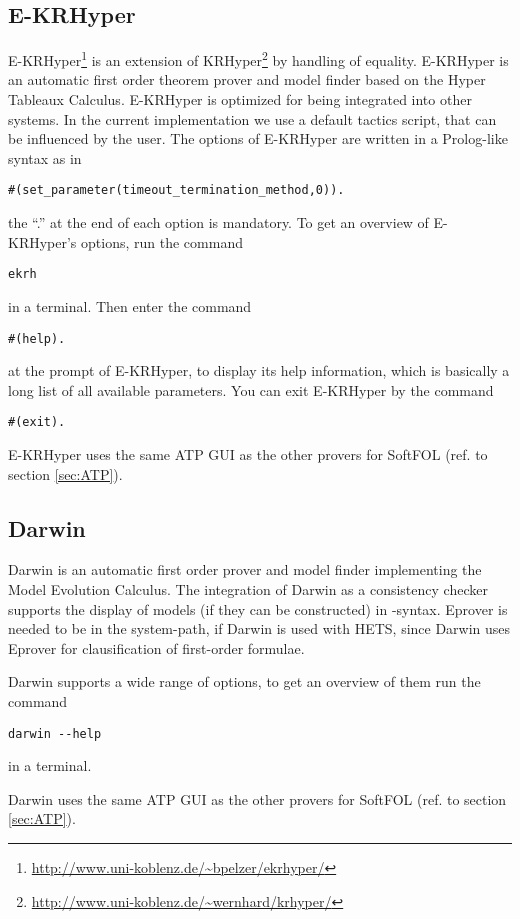 \documentclass{article}
\newcommand{\normalTEXTSC}[2]{{#1\scriptsize#2}}
\newcommand     {\Hets}{\normalTEXTSC{H}{ETS}\xspace}
\begin{document}
\subsection{E-KRHyper}
E-KRHyper\footnote{\url{http://www.uni-koblenz.de/~bpelzer/ekrhyper/}}
is an extension of
KRHyper\footnote{\url{http://www.uni-koblenz.de/~wernhard/krhyper/}} by
handling of equality. E-KRHyper is an automatic first order theorem
prover and model finder based on the Hyper Tableaux Calculus\cite{Baumgartner:1996}.
E-KRHyper is optimized for being integrated into other systems. In the current
implementation we use a default tactics script, that can be influenced by the user.
The options of E-KRHyper are written in a Prolog-like syntax as in
\begin{verbatim}
#(set_parameter(timeout_termination_method,0)).
\end{verbatim}
the ``.'' at the end of each option is mandatory. To get an overview of
E-KRHyper's options, run the command
\begin{verbatim}
ekrh
\end{verbatim}
in a terminal. Then enter the command
\begin{verbatim}
#(help).
\end{verbatim}
at the prompt of E-KRHyper, to display its help information, which is basically
a long list of all available parameters. You can exit E-KRHyper by the command
\begin{verbatim}
#(exit).
\end{verbatim}

E-KRHyper uses the same ATP GUI as the other provers for SoftFOL (ref. to section
\ref{sec:ATP}).
\subsection{Darwin}
Darwin is an automatic first order prover and model finder implementing the Model
Evolution
Calculus\cite{Baumgartner:2003}. The integration of Darwin as a consistency checker
supports the display of models (if they can be constructed) in \CASL-syntax.
Eprover is needed to be in the system-path, if Darwin is used with \Hets, since
Darwin uses Eprover for clausification of first-order formulae.

Darwin supports a wide range of options, to get an overview of them run the command
\begin{verbatim}
darwin --help
\end{verbatim}
in a terminal.

Darwin uses the same ATP GUI as the other provers for SoftFOL (ref. to section
\ref{sec:ATP}).
\end{document}
